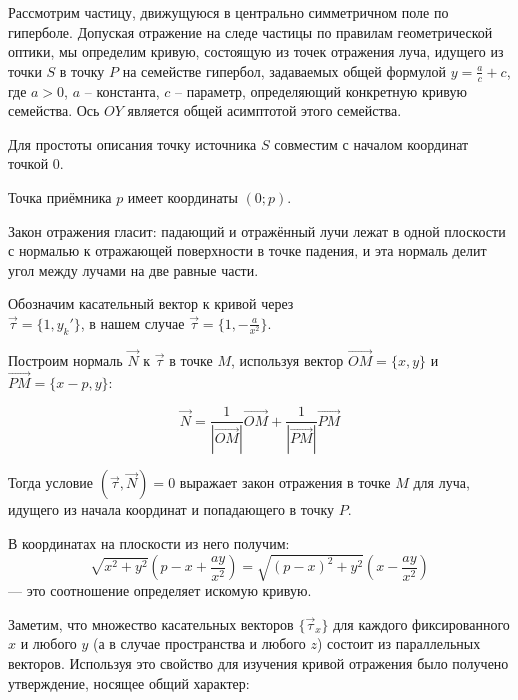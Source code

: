 



\vzmscaption

Рассмотрим частицу, движущуюся в центрально симметричном поле по гиперболе. Допуская отражение на следе частицы по правилам геометрической оптики, мы определим кривую, состоящую из точек отражения луча, идущего из точки $S$ в точку $P$ на семействе гипербол, задаваемых общей формулой $y= \frac ac + c$, где $a > 0$, $a$ – константа, $c$ – параметр, определяющий конкретную кривую семейства. Ось $OY$ является общей асимптотой этого семейства.

Для простоты описания точку источника $S$ совместим с началом координат точкой $0$.

Точка приёмника $p$ имеет координаты $(0;p)$.

Закон отражения гласит: падающий и отражённый лучи лежат в одной плоскости с нормалью к отражающей поверхности в точке падения, и эта нормаль делит угол между лучами на две равные части.

Обозначим касательный вектор к кривой через \\ $\vec \tau = \{ 1, y_k' \}$, в нашем случае $\vec \tau = \{ 1,- \frac{a}{x^2} \}$.

Построим нормаль $\vec N$ к $\vec \tau$ в точке $M$, используя вектор $\overrightarrow{OM}=\{x,y\}$ и $\overrightarrow{PM}=\{x-p,y\}$:

$$ \vec{N}=\frac{1}{|\overrightarrow{OM}|}\overrightarrow{OM}+\frac{1}{|\overrightarrow{PM}|}\overrightarrow{PM} $$

Тогда условие $(\vec \tau , \vec N)=0$ выражает закон отражения в точке $M$ для луча, идущего из начала координат и попадающего в точку $P$.

В координатах на плоскости из него получим:
\[
\sqrt{x^2+y^2}
\left( p-x+ \frac{ay}{x^2} \right)
=
\sqrt{{(p-x)}^2+y^2}
\left( x - \frac{ay}{x^2} \right)
\]
    --- это соотношение определяет искомую кривую.

Заметим, что множество касательных векторов $\{ \vec \tau_x \}$ для каждого фиксированного $x$ и любого $y$ (а в случае пространства и любого $z$) состоит из параллельных векторов. Используя это свойство для изучения кривой отражения было получено утверждение, носящее общий характер:

